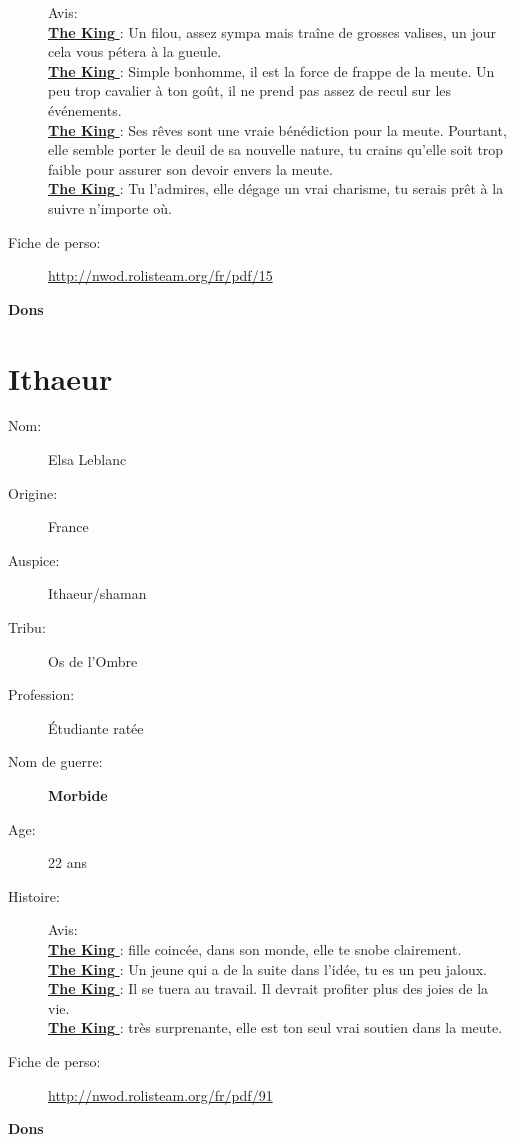 \documentclass[oneside,12pt]{book}
\newcommand{\King}{\textbf{The King} }
\newcommand{\Elsa}{\textbf{Morbide} }
\begin{document}
\begin{flushleft}
\begin{description}
{Avis:\\
\underline{\King} : Un filou, assez sympa mais traîne de grosses valises, un jour cela vous pétera à la gueule.\\
\underline{\King} : Simple bonhomme, il est la force de frappe de la meute. Un peu trop cavalier à ton goût, il ne prend pas assez de recul sur les événements.\\
\underline{\King}  : Ses rêves sont une vraie bénédiction pour la meute. Pourtant, elle semble porter le deuil de sa nouvelle nature, tu crains qu'elle soit trop faible pour assurer son devoir envers la meute.\\
\underline{\King}: Tu l'admires, elle dégage un vrai charisme, tu serais prêt à la suivre n'importe où.\\
}
\item[Fiche de perso:]{\href{http://nwod.rolisteam.org/fr/pdf/15}{http://nwod.rolisteam.org/fr/pdf/15}}
\end{description}
\clearpage
\textbf{\large Dons} 
\vspace{0.5cm}



\clearpage
\section{Ithaeur}
\begin{description}
\item[Nom:]{Elsa Leblanc}
\item[Origine:]{France}
\item[Auspice:]{Ithaeur/shaman}
\item[Tribu:]{Os de l’Ombre}
\item[Profession:]{Étudiante ratée}
\item[Nom de guerre:]{\Elsa}
\item[Age:]{22 ans}
\item[Histoire:]{


Avis:\\
\underline{\King} : fille coincée, dans son monde, elle te snobe clairement.\\
\underline{\King} : Un jeune qui a de la suite dans l'idée, tu es un peu jaloux.\\
\underline{\King} : Il se tuera au travail. Il devrait profiter plus des joies de la vie.\\
\underline{\King} : très surprenante, elle est ton seul vrai soutien dans la meute. \\
}
\item[Fiche de perso:]{\href{http://nwod.rolisteam.org/fr/pdf/91}{http://nwod.rolisteam.org/fr/pdf/91}}
\end{description}
\clearpage
\textbf{\large Dons} 
\vspace{0.5cm}


\end{flushleft}
\end{document}
